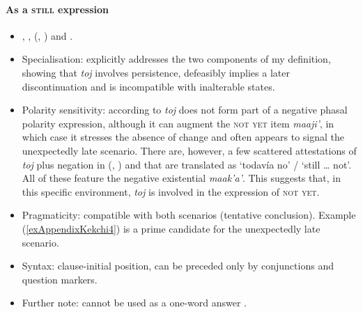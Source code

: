 \paragraph{As a \textsc{still} expression}
\begin{itemize}
	\item  \textcite[171, 303]{VocabularioKechi2004}, \citeauthor{Kockelman2010}, (\citeyear[105–106]{Kockelman2010}, \citeyear{Kockelman2020}) and \textcite[360]{SamJuarezEtAl2003}.
	\item Specialisation: \textcite{Kockelman2020} explicitly addresses the two components of my definition, showing that \textit{toj} involves persistence, defeasibly implies a later discontinuation and is incompatible with inalterable states.
	\item Polarity sensitivity: according to \textcite{Kockelman2020} \textit{toj} does not form part of a negative phasal polarity expression, although it can augment the \textsc{not yet} item \textit{maaji'}‚ in which case it stresses the absence of change and often appears to signal the unexpectedly late scenario. There are, however, a few scattered attestations of \textit{toj} plus negation in \citeauthor{Kockelman2010} (\citeyear{Kockelman2010}, \citeyear{Kockelman2020}) and \textcite{SamJuarezEtAl2003} that are translated as \lq todavía no' / \lq still … not'. All of these feature the negative existential \textit{maak'a'}. This suggests that, in this specific environment, \textit{toj} is involved in the expression of \textsc{not yet}.
		\item Pragmaticity: compatible with both scenarios (tentative conclusion). Example (\ref{exAppendixKekchi4}) is a prime candidate for the unexpectedly late scenario.
	\item Syntax: clause-initial position, can be preceded only by conjunctions and question markers.
	\item Further note: cannot be used as a one-word answer \parencite[459]{Kockelman2020}.
\end{itemize}

